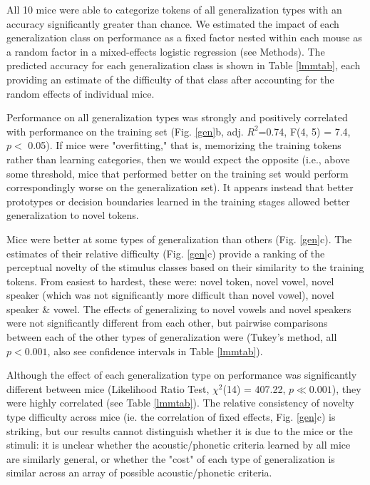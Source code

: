 All 10 mice were able to categorize tokens of all generalization types with an accuracy significantly greater than chance. We estimated the impact of each generalization class on performance as a fixed factor nested within each mouse as a random factor in a mixed-effects logistic regression (see Methods). The predicted accuracy for each generalization class is shown in Table \ref{lmmtab}, each providing an estimate of the difficulty of that class after accounting for the random effects of individual mice.

Performance on all generalization types was strongly and positively correlated with performance on the training set (Fig. \ref{gen}b, adj. $R^2$=0.74, F(4, 5) = 7.4, $p <$ 0.05). If mice were "overfitting," that is, memorizing the training tokens rather than learning categories, then we would expect the opposite (i.e., above some threshold, mice that performed better on the training set would perform correspondingly worse on the generalization set). It appears instead that better prototypes or decision boundaries learned in the training stages allowed better generalization to novel tokens.

Mice were better at some types of generalization than others (Fig. \ref{gen}c). The estimates of their relative difficulty (Fig. \ref{gen}c) provide a ranking of the perceptual novelty of the stimulus classes based on their similarity to the training tokens. From easiest to hardest, these were: novel token, novel vowel, novel speaker (which was not significantly more difficult than novel vowel), novel speaker \& vowel. The effects of generalizing to novel vowels and novel speakers were not significantly different from each other, but pairwise comparisons between each of the other types of generalization were (Tukey's method, all $p < 0.001$, also see confidence intervals in Table \ref{lmmtab}).

Although the effect of each generalization type on performance was significantly different between mice (Likelihood Ratio Test, $\chi^2$(14) = 407.22, $p \ll 0.001$), they were highly correlated (see Table \ref{lmmtab}). The relative consistency of novelty type difficulty across mice (ie. the correlation of fixed effects, Fig. \ref{gen}c) is striking, but our results cannot distinguish whether it is due to the mice or the stimuli: it is unclear whether the acoustic/phonetic criteria learned by all mice are similarly general, or whether the "cost" of each type of generalization is similar across an array of possible acoustic/phonetic criteria.


